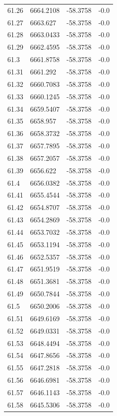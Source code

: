 \begin{table}[H]
\begin{tabular}{llll}
61.26 & 6664.2108 & -58.3758 & -0.0 \\
61.27 & 6663.627 & -58.3758 & -0.0 \\
61.28 & 6663.0433 & -58.3758 & -0.0 \\
61.29 & 6662.4595 & -58.3758 & -0.0 \\
61.3 & 6661.8758 & -58.3758 & -0.0 \\
61.31 & 6661.292 & -58.3758 & -0.0 \\
61.32 & 6660.7083 & -58.3758 & -0.0 \\
61.33 & 6660.1245 & -58.3758 & -0.0 \\
61.34 & 6659.5407 & -58.3758 & -0.0 \\
61.35 & 6658.957 & -58.3758 & -0.0 \\
61.36 & 6658.3732 & -58.3758 & -0.0 \\
61.37 & 6657.7895 & -58.3758 & -0.0 \\
61.38 & 6657.2057 & -58.3758 & -0.0 \\
61.39 & 6656.622 & -58.3758 & -0.0 \\
61.4 & 6656.0382 & -58.3758 & -0.0 \\
61.41 & 6655.4544 & -58.3758 & -0.0 \\
61.42 & 6654.8707 & -58.3758 & -0.0 \\
61.43 & 6654.2869 & -58.3758 & -0.0 \\
61.44 & 6653.7032 & -58.3758 & -0.0 \\
61.45 & 6653.1194 & -58.3758 & -0.0 \\
61.46 & 6652.5357 & -58.3758 & -0.0 \\
61.47 & 6651.9519 & -58.3758 & -0.0 \\
61.48 & 6651.3681 & -58.3758 & -0.0 \\
61.49 & 6650.7844 & -58.3758 & -0.0 \\
61.5 & 6650.2006 & -58.3758 & -0.0 \\
61.51 & 6649.6169 & -58.3758 & -0.0 \\
61.52 & 6649.0331 & -58.3758 & -0.0 \\
61.53 & 6648.4494 & -58.3758 & -0.0 \\
61.54 & 6647.8656 & -58.3758 & -0.0 \\
61.55 & 6647.2818 & -58.3758 & -0.0 \\
61.56 & 6646.6981 & -58.3758 & -0.0 \\
61.57 & 6646.1143 & -58.3758 & -0.0 \\
61.58 & 6645.5306 & -58.3758 & -0.0 \\

\end{tabular}
\end{table}
